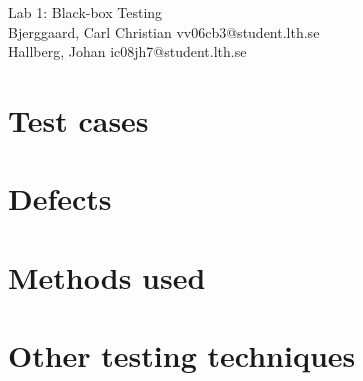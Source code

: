 \documentclass[titlepage]{article}
\begin{document}
\begin{center}
	\huge{Lab 1: Black-box Testing } \\
	\small{Bjerggaard, Carl Christian vv06cb3@student.lth.se \\Hallberg, Johan ic08jh7@student.lth.se}

\vspace*{1cm}

\end{center}

\thispagestyle{empty}

\clearpage
\section{Test cases}


\section{Defects}


\section{Methods used}


\section{Other testing techniques}
\end{document}
